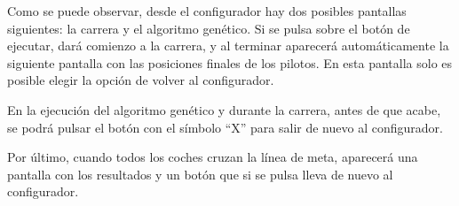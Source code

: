 Como se puede observar, desde el configurador hay dos posibles pantallas siguientes: la carrera y el algoritmo genético. Si se pulsa sobre el botón de ejecutar, dará comienzo a la carrera, y al terminar aparecerá automáticamente la siguiente pantalla con las posiciones finales de los pilotos. En esta pantalla solo es posible elegir la opción de volver al configurador. 

\bigskip

En la ejecución del algoritmo genético y durante la carrera, antes de que acabe, se podrá pulsar el botón con el símbolo ``X'' para salir de nuevo al configurador.

\bigskip

Por último, cuando todos los coches cruzan la línea de meta, aparecerá una pantalla con los resultados y un botón que si se pulsa lleva de nuevo al configurador.

